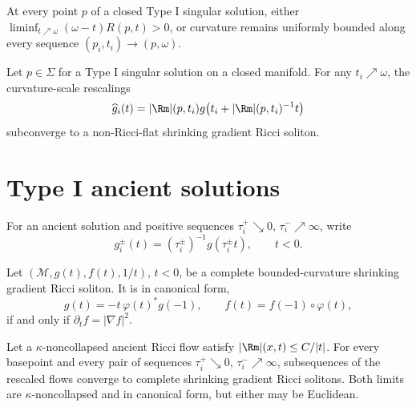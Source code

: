 \begin{corollary}
\label{cor:chow-iv-distinguish-type-i-singular-points}
At every point \(p\) of a closed Type I singular solution, either
\(\liminf_{t\nearrow\omega}(\omega-t)R(p,t)>0\), or curvature remains
uniformly bounded along every sequence \((p_i,t_i)\to(p,\omega)\).
\end{corollary}

\begin{theorem}
\label{thm:chow-iv-singular-point-curvature-scale-limits-nonflat}
Let \(p\in\Sigma\) for a Type I singular solution on a closed manifold.  For
any \(t_i\nearrow\omega\), the curvature-scale rescalings
\[
 \widehat g_i(t)=|\Rm|(p,t_i)
 g\bigl(t_i+|\Rm|(p,t_i)^{-1}t\bigr)
\]
subconverge to a non-Ricci-flat shrinking gradient Ricci soliton.
\end{theorem}

\section{Type I ancient solutions}

For an ancient solution and positive sequences
\(\tau_i^+\searrow0\), \(\tau_i^-\nearrow\infty\), write
\[
 g_i^\pm(t)=(\tau_i^\pm)^{-1}g(\tau_i^\pm t),\qquad t<0.
\]

\begin{lemma}
\label{lem:chow-iv-shrinker-canonical-form-characterization}
Let \((\mathcal M,g(t),f(t),1/t)\), \(t<0\), be a complete
bounded-curvature shrinking gradient Ricci soliton.  It is in canonical form,
\[
 g(t)=-t\,\varphi(t)^*g(-1),\qquad
 f(t)=f(-1)\circ\varphi(t),
\]
if and only if \(\partial_t f=|\nabla f|^2\).
\end{lemma}

\begin{theorem}
\label{thm:chow-iv-type-i-ancient-asymptotic-shrinkers}
Let a \(\kappa\)-noncollapsed ancient Ricci flow satisfy
\(|\Rm|(x,t)\leq C/|t|\).  For every basepoint and every pair of sequences
\(\tau_i^+\searrow0\), \(\tau_i^-\nearrow\infty\), subsequences of the
rescaled flows converge to complete shrinking gradient Ricci solitons.  Both
limits are \(\kappa\)-noncollapsed and in canonical form, but either may be
Euclidean.
\end{theorem}

